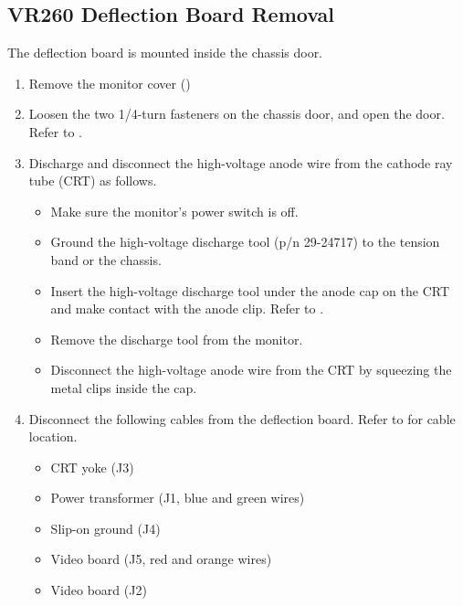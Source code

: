 \newpage

\subsection{VR260 Deflection Board Removal}

The deflection board is mounted inside the chassis door.

\begin{enumerate}

\item	Remove the monitor cover ()

\item	Loosen the two 1/4-turn fasteners on the chassis door, and open the
		door. Refer to .


\newpage

\item	Discharge and disconnect the high-voltage anode wire from the cathode
		ray tube (CRT) as follows.

		\begin{itemize}
	
		\item	Make sure the monitor's power switch is off.

		\item	Ground the high-voltage discharge tool (p/n 29-24717) to the tension
				band or the chassis.

		\item	Insert the high-voltage discharge tool under the anode cap on the
				CRT and make contact with the anode clip. Refer to .


		\item	Remove the discharge tool from the monitor.

		\item	Disconnect the high-voltage anode wire from the CRT by squeezing
				the metal clips inside the cap.

		\end{itemize}
\newpage

\item	Disconnect the following cables from the deflection board.
		Refer to  for cable location.

		\begin{itemize}
		\item	CRT yoke (J3)
		\item	Power transformer (J1, blue and green wires)
		\item	Slip-on ground (J4)
		\item	Video board (J5, red and orange wires)
		\item	Video board (J2)
		\end{itemize}


\end{enumerate}
